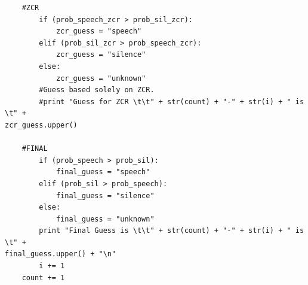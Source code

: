 \documentclass[12pt]{article} %
\begin{document}
\begin{verbatim}
	#ZCR
		if (prob_speech_zcr > prob_sil_zcr):
			zcr_guess = "speech"
		elif (prob_sil_zcr > prob_speech_zcr):
			zcr_guess = "silence"
		else:
			zcr_guess = "unknown"
		#Guess based solely on ZCR.
		#print "Guess for ZCR \t\t" + str(count) + "-" + str(i) + " is \t" +
zcr_guess.upper()
		
	#FINAL
		if (prob_speech > prob_sil):
			final_guess = "speech"
		elif (prob_sil > prob_speech):
			final_guess = "silence"
		else:
			final_guess = "unknown"
		print "Final Guess is \t\t" + str(count) + "-" + str(i) + " is \t" +
final_guess.upper() + "\n"
		i += 1
	count += 1

\end{verbatim}
\end{document}
